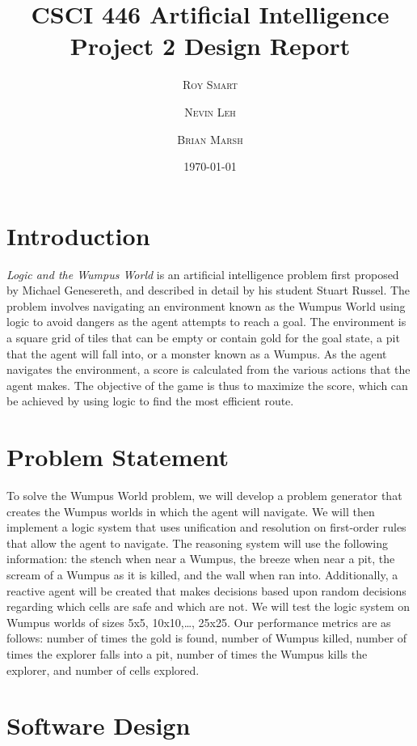 \documentclass{article}
\title{\vspace{-15mm}\fontsize{24pt}{10pt}\selectfont\textbf{CSCI 446 Artificial Intelligence \\[2mm] Project 2 Design Report} } %
\date{\today}
\author{
\large
\textsc{Roy Smart} \and \textsc{Nevin Leh} \and \textsc{Brian Marsh}\\[2mm] %
}
\begin{document}
	\maketitle %
	\thispagestyle{fancy} %
	\normalsize

	\section{Introduction}
	
		\textit{Logic and the Wumpus World} is an artificial intelligence problem first proposed by Michael Genesereth, and described in detail by his student Stuart Russel\cite{ai}.  The problem involves navigating an environment known as the Wumpus World using logic to avoid dangers as the agent attempts to reach a goal.  The environment is a square grid of tiles that can be empty or contain gold for the goal state, a pit that the agent will fall into, or a monster known as a Wumpus.  As the agent navigates the environment, a score is calculated from the various actions that the agent makes.  The objective of the game is thus to maximize the score, which can be achieved by using logic to find the most efficient route.
	
	\section{Problem Statement}
	
		To solve the Wumpus World problem, we will develop a problem generator that creates the Wumpus worlds in which the agent will navigate.  We will then implement a logic system that uses unification and resolution on first-order rules that allow the agent to navigate.  The reasoning system will use the following information: the stench when near a Wumpus, the breeze when near a pit, the scream of a Wumpus as it is killed, and the wall when ran into.  Additionally, a reactive agent will be created that makes decisions based upon random decisions regarding which cells are safe and which are not.  We will test the logic system on Wumpus worlds of sizes {5x5, 10x10,…, 25x25}.  Our performance metrics are as follows: number of times the gold is found, number of Wumpus killed, number of times the explorer falls into a pit, number of times the Wumpus kills the explorer, and number of cells explored.
	
	\section{Software Design}
	
\end{document}
